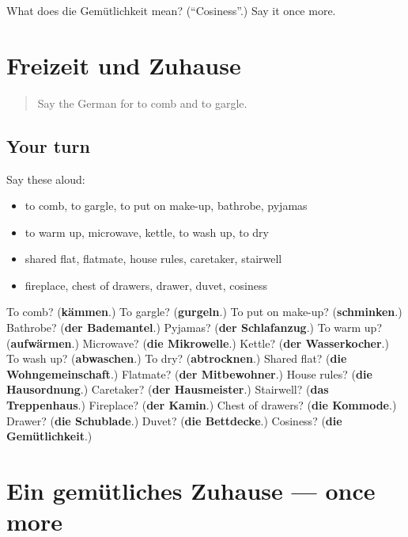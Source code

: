 \begin{tcolorbox}[breakable,colback=teal!4,colframe=teal!35!black,title={Before you move on}]
What does die Gemütlichkeit mean? (\textquotedblleft{}Cosiness\textquotedblright{}.) Say it once more.
\end{tcolorbox}
\section[(dialogue)]{Freizeit und Zuhause}

\label{lesson:GE-R533-review-530-533}



\begin{quote}
Say the German for to comb and to gargle.
\end{quote}

\subsection*{Your turn}
Say these aloud:

\begin{itemize}
\raggedright
  \item to comb, to gargle, to put on make-up, bathrobe, pyjamas
  \item to warm up, microwave, kettle, to wash up, to dry
  \item shared flat, flatmate, house rules, caretaker, stairwell
  \item fireplace, chest of drawers, drawer, duvet, cosiness
\end{itemize}

\begin{tcolorbox}[breakable,colback=teal!4,colframe=teal!35!black,title={Before you move on}]
To comb? (\textbf{kämmen}.) To gargle? (\textbf{gurgeln}.) To put on make-up? (\textbf{schminken}.) Bathrobe? (\textbf{der Bademantel}.) Pyjamas? (\textbf{der Schlafanzug}.) To warm up? (\textbf{aufwärmen}.) Microwave? (\textbf{die Mikrowelle}.) Kettle? (\textbf{der Wasserkocher}.) To wash up? (\textbf{abwaschen}.) To dry? (\textbf{abtrocknen}.) Shared flat? (\textbf{die Wohngemeinschaft}.) Flatmate? (\textbf{der Mitbewohner}.) House rules? (\textbf{die Hausordnung}.) Caretaker? (\textbf{der Hausmeister}.) Stairwell? (\textbf{das Treppenhaus}.) Fireplace? (\textbf{der Kamin}.) Chest of drawers? (\textbf{die Kommode}.) Drawer? (\textbf{die Schublade}.) Duvet? (\textbf{die Bettdecke}.) Cosiness? (\textbf{die Gemütlichkeit}.)
\end{tcolorbox}
\section[(dialogue)]{Ein gemütliches Zuhause — once more}


